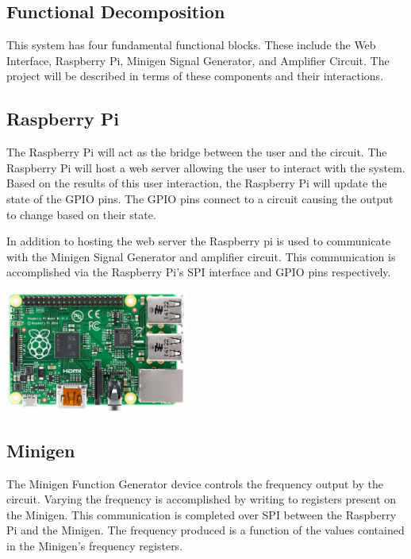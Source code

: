 \documentclass{article}	%
\begin{document}
\begin{multicols}{2}
\section{Functional Decomposition}
This system has four fundamental functional blocks.
These include the 
Web Interface, 
Raspberry Pi, 
Minigen Signal Generator, and
Amplifier Circuit.
The project will be described in terms of 
these components and
their interactions.

\subsection{Raspberry Pi}
The Raspberry Pi will act as the bridge between the user and the circuit.
The Raspberry Pi will host a web server allowing the user to interact with the system.
Based on the results of this user interaction, 
the Raspberry Pi will update the state of the GPIO pins.
The GPIO pins connect to a circuit causing the output to change based on their state. 

In addition to hosting the web server the Raspberry pi is used to
communicate with the 
Minigen Signal Generator and 
amplifier circuit.
This communication is accomplished via 
the Raspberry Pi's SPI interface and
GPIO pins respectively.


\begin{center}
\includegraphics[width=0.45\textwidth,keepaspectratio]{rpi_real.png}
\end{center}

\subsection{Minigen}
The Minigen Function Generator device controls the frequency output by the circuit.
Varying the frequency is accomplished 
by writing to registers present on the Minigen.
This communication is completed over SPI between
the Raspberry Pi and the Minigen.
The frequency produced is a function of
the values contained in the Minigen's frequency registers.


\end{multicols}
\end{document}
